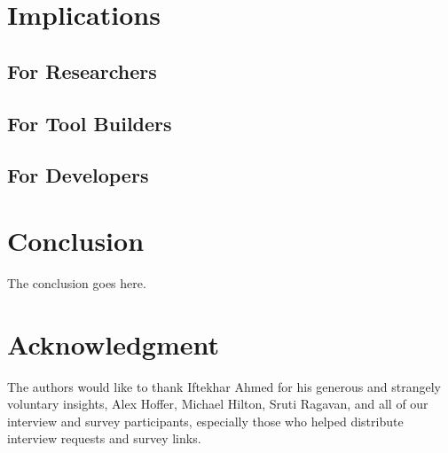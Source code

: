 \section{Implications}
\subsection{For Researchers}
\subsection{For Tool Builders}
\subsection{For Developers}


\section{Conclusion}
The conclusion goes here.

\section*{Acknowledgment}

The authors would like to thank Iftekhar Ahmed for his generous and strangely voluntary insights, Alex Hoffer, Michael Hilton, Sruti Ragavan, and all of our interview and survey participants, especially those who helped distribute interview requests and survey links.

\nocite{*}

{}
%
%







